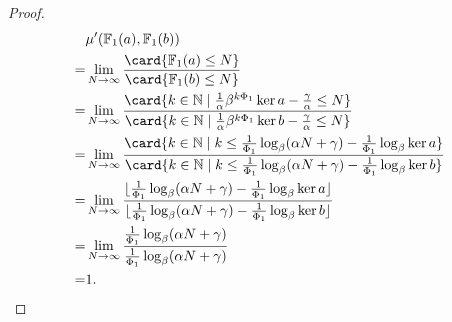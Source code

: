 \begin{proof}
	\begin{align*}
		&\mu'(\mathbb{F}_{1}(a), \mathbb{F}_{1}(b)) \\
		=&\lim_{N\to\infty}\frac{\card\{\mathbb{F}_{1}(a) \le N\}}{\card\{\mathbb{F}_{1}(b) \le N\}} \\
		=&\lim_{N\to\infty}\frac{\card\{k\in\mathbb{N} \mid \frac{1}{\alpha}\beta^{k\Phi_1}\ker a - \frac{\gamma}{\alpha} \le N\}}{\card\{k\in\mathbb{N} \mid \frac{1}{\alpha}\beta^{k\Phi_1}\ker b - \frac{\gamma}{\alpha} \le N\}} \\
		=&\lim_{N\to\infty}\frac{\card\{k\in\mathbb{N} \mid k \le \frac{1}{\Phi_1} \log_{\beta}(\alpha N + \gamma) - \frac{1}{\Phi_1}\log_{\beta}\ker a\}}{\card\{k\in\mathbb{N} \mid k \le \frac{1}{\Phi_1} \log_{\beta}(\alpha N + \gamma) - \frac{1}{\Phi_1}\log_{\beta}\ker b\}} \\
		=&\lim_{N\to\infty}\frac{\lfloor\frac{1}{\Phi_1} \log_{\beta}(\alpha N + \gamma) - \frac{1}{\Phi_1}\log_{\beta}\ker a\rfloor}{\lfloor \frac{1}{\Phi_1} \log_{\beta}(\alpha N + \gamma) - \frac{1}{\Phi_1}\log_{\beta}\ker b\rfloor} \\
		=&\lim_{N\to\infty}\frac{\frac{1}{\Phi_1} \log_{\beta}(\alpha N + \gamma)}{\frac{1}{\Phi_1} \log_{\beta}(\alpha N + \gamma)} \\
		=&1. 
	\end{align*}
\end{proof}
